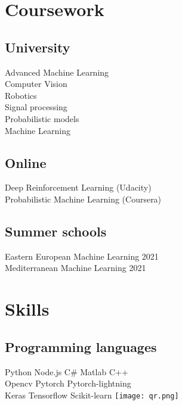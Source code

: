 \documentclass[]{resume}
\begin{document}
\begin{minipage}[t]{0.33\textwidth}
\section{Coursework}
\subsection{University}
Advanced Machine Learning \\
Computer Vision \\
Robotics \\
Signal processing \\
Probabilistic models \\
Machine Learning\\
\sectionsep
\subsection{Online}
Deep Reinforcement Learning (Udacity) \\
Probabilistic Machine Learning (Coursera) \\
\sectionsep
\subsection{Summer schools}
Eastern European Machine Learning 2021\\
Mediterranean Machine Learning 2021\\
\sectionsep



\section{Skills}
\subsection{Programming languages}
 Python \textbullet{} Node.js \textbullet{} C\#  \textbullet{} Matlab \textbullet{} C++  \\
Opencv \textbullet{} Pytorch \textbullet{} Pytorch-lightning \\ Keras \textbullet{} 
Tensorflow \textbullet{} Scikit-learn \textbullet{} 
\sectionsep
\sectionsep
    \hspace{8cm} \texttt{[image: qr.png]}


%
%

\end{minipage} 
\end{document}
